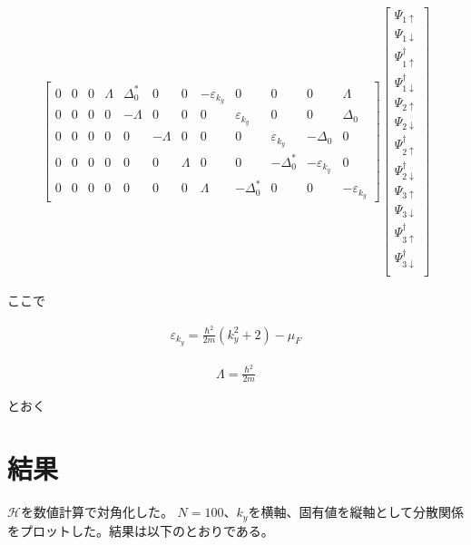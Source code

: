 \documentclass{jsarticle}
\begin{document}
\begin{align}
\begin{bmatrix}
				0 & 0 & 0 & \varLambda & \Delta_0^\ast & 0 & 0 & -\varepsilon_{k_y} & 0 & 0 & 0 & \varLambda \\
				0 & 0 & 0 & 0 & -\varLambda & 0 & 0 & 0 & \varepsilon_{k_y} & 0 & 0 & \Delta_0 \\
				0 & 0 & 0 & 0 & 0 & -\varLambda & 0 & 0 & 0 & \varepsilon_{k_y} & -\Delta_0 & 0 \\
				0 & 0 & 0 & 0 & 0 & 0 & \varLambda & 0 & 0 & -\Delta_0^\ast & -\varepsilon_{k_y} & 0 \\
				0 & 0 & 0 & 0 & 0 & 0 & 0 & \varLambda & -\Delta_0^\ast & 0 & 0 & -\varepsilon_{k_y}
			\end{bmatrix}
			\begin{bmatrix}
				\Psi_{1\uparrow} \\
				\Psi_{1\downarrow} \\
				\Psi_{1\uparrow}^\dagger \\
				\Psi_{1\downarrow}^\dagger \\
				\Psi_{2\uparrow} \\
				\Psi_{2\downarrow} \\
				\Psi_{2\uparrow}^\dagger \\
				\Psi_{2\downarrow}^\dagger \\
				\Psi_{3\uparrow} \\
				\Psi_{3\downarrow} \\
				\Psi_{3\uparrow}^\dagger \\
				\Psi_{3\downarrow}^\dagger \\
			\end{bmatrix}
		\end{align}

		ここで

		\begin{align}
			\varepsilon_{k_y}=\frac{\hbar^2}{2m}(k_y^2+2)-\mu_F
		\end{align}

		\begin{align}
			\varLambda=\frac{\hbar^2}{2m}
		\end{align}

		とおく

		\section{結果}
		$\mathcal{H}$を数値計算で対角化した。
		$N=100$、$k_y$を横軸、固有値を縦軸として分散関係をプロットした。結果は以下のとおりである。
\end{document}
